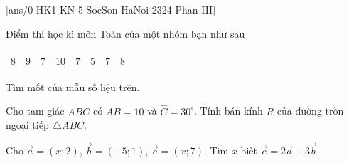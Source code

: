 \caukq
{}[ans/0-HK1-KN-5-SocSon-HaNoi-2324-Phan-III]
\setcounter{ex}{0}
\begin{ex}%
	Điểm thi học kì môn Toán của một nhóm bạn như sau
	\begin{center}
		\begin{tabular}{|c|c|c|c|c|c|c|c|}
			\hline
			$8$ & $9$ & $7$ & $10$ & $7$ & $5$ & $7$ & $8$ \\ \hline
		\end{tabular}
	\end{center}
	Tìm mốt của mẫu số liệu trên.
\end{ex}
\begin{ex}%
	Cho tam giác $ABC$ có $AB=10$ và $\widehat{C}=30^\circ$. Tính bán kính $R$ của đường tròn ngoại tiếp $\triangle ABC$.
\end{ex}
\begin{ex}%
	Cho $\overrightarrow{a}=(x;2)$, $\overrightarrow{b}=(-5;1)$, $\overrightarrow{c}=(x;7)$. Tìm $x$ biết $\overrightarrow{c}=2\overrightarrow{a}+3\overrightarrow{b}$.
\end{ex}
